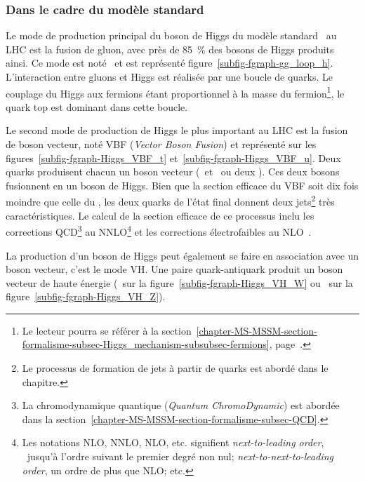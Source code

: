 \subsubsection{Dans le cadre du modèle standard}\label{chapter-MS-MSSM-section-pheno_Higgs_MSSM-subsec-production-SM}
Le mode de production principal du boson de Higgs du modèle standard \higgs\ au LHC est la fusion de gluon, avec près de \SI{85}{\%} des bosons de Higgs produits ainsi.
Ce mode est noté \gluon\gluon\higgs\ et est représenté figure~\ref{subfig-fgraph-gg_loop_h}.
L'interaction entre gluons et Higgs est réalisée par une boucle de quarks.
Le couplage du Higgs aux fermions étant proportionnel à la masse du fermion\footnote{Le lecteur pourra se référer à la section~\ref{chapter-MS-MSSM-section-formalisme-subsec-Higgs_mechanism-subsubsec-fermions}, page~\pageref{chapter-MS-MSSM-section-formalisme-subsec-Higgs_mechanism-subsubsec-fermions}.}, le quark top est dominant dans cette boucle.
\par Le second mode de production de Higgs le plus important au LHC est la fusion de boson vecteur, noté VBF (\emph{Vector Boson Fusion}) et représenté sur les figures~\ref{subfig-fgraph-Higgs_VBF_t} et~\ref{subfig-fgraph-Higgs_VBF_u}.
Deux quarks produisent chacun un boson vecteur (\Wbosonplus\ et \Wbosonminus\ ou deux \Zboson).
Ces deux bosons fusionnent en un boson de Higgs.
Bien que la section efficace du VBF soit dix fois moindre que celle du \gluon\gluon\higgs, les deux quarks de l'état final donnent deux jets\footnote{Le processus de formation de jets à partir de quarks est abordé dans le chapitre.} très caractéristiques.
Le calcul de la section efficace de ce processus inclu les corrections QCD\footnote{La chromodynamique quantique (\emph{Quantum ChromoDynamic}) est abordée dans la section~\ref{chapter-MS-MSSM-section-formalisme-subsec-QCD}.} au NNLO\footnote{Les notations NLO, NNLO, NLO, etc. signifient \emph{next-to-leading order}, \ie\ jusqu'à l'ordre suivant le premier degré non nul; \emph{next-to-next-to-leading order}, un ordre de plus que NLO; etc.} et les corrections électrofaibles au NLO~\cite{Higgs_xsec_book_4,PhysRevD.85.035002}.
\par La production d'un boson de Higgs peut également se faire en association avec un boson vecteur, c'est le mode VH.
Une paire quark-antiquark produit un boson vecteur de haute énergie (\Wboson\ sur la figure~\ref{subfig-fgraph-Higgs_VH_W} ou \Zboson\ sur la figure~\ref{subfig-fgraph-Higgs_VH_Z}).
